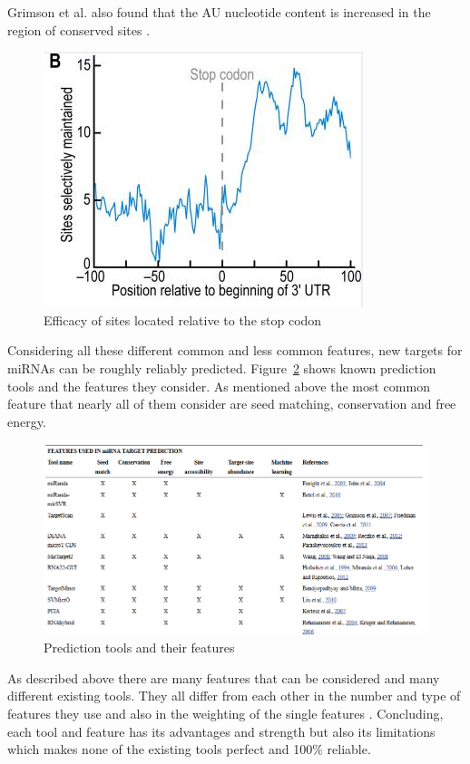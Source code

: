 \documentclass[12pt]{article}
\begin{document}
Grimson et al. also found that the AU nucleotide content is increased in the region of conserved sites \cite{Grimson}.

\begin{figure}[h]
\centering
\includegraphics[scale=0.5]{results/site_stop.PNG} 
\caption{Efficacy of sites located relative to the stop codon}
\label{sitestop}
\end{figure}

   
Considering all these different common and less common features, new targets for miRNAs can be roughly reliably predicted. Figure~\ref{fig:tools} shows known prediction tools and the features they consider. As mentioned above the most common feature that nearly all of them consider are seed matching, conservation and free energy. 


\begin{figure}[h]
\centering
\includegraphics[scale=0.5]{results/tools.PNG}
\caption{Prediction tools and their features}
\label{fig:tools}
\end{figure}


\vspace{2cm}

As described above there are many features that can be considered and many different existing tools. They all differ from each other in the number and type of features they use and also in the weighting of the single features \cite{Peterson}. Concluding, each tool and feature has its advantages and strength but also its limitations which makes none of the existing tools perfect and 100\% reliable. 
\end{document}
